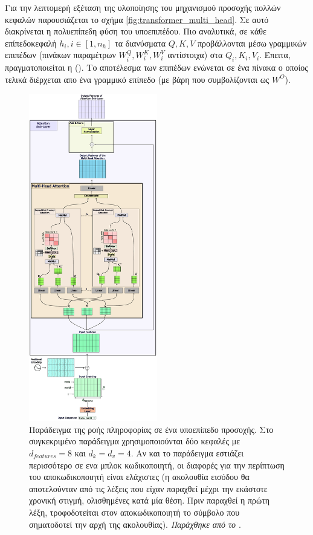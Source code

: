 Για την λεπτομερή εξέταση της υλοποίησης του μηχανισμού προσοχής πολλών κεφαλών παρουσιάζεται το σχήμα \ref{fig:transformer_multi_head}. Σε αυτό διακρίνεται η πολυεπίπεδη φύση του υπο\textendash επιπέδου. Πιο αναλυτικά, σε κάθε επίπεδο\textemdash κεφαλή $h_i, i \in [1,n_h]$ τα διανύσματα $Q, K, V$ προβάλλονται μέσω γραμμικών επιπέδων (πινάκων παραμέτρων $W_i^Q, W_i^K, W_i^V$ αντίστοιχα) στα $Q_i, K_i, V_i$. Έπειτα, πραγματοποιείται η  (). Το αποτέλεσμα των επιπέδων ενώνεται σε ένα πίνακα ο οποίος τελικά διέρχεται απο ένα γραμμικό επίπεδο (με βάρη που συμβολίζονται ως $W^O$). \par

\begin{figure}[p]
  \centering
  \includegraphics[width=0.5\textwidth]{images/chapter theoritical background/transformer_flow.pdf}
  \caption{Παράδειγμα της ροής πληροφορίας σε ένα υποεπίπεδο προσοχής. Στο συγκεκριμένο παράδειγμα χρησιμοποιούνται δύο κεφαλές με $d_{features} = 8$ και $d_k=d_v=4$. Αν και το παράδειγμα εστιάζει περισσότερο σε ενα μπλοκ κωδικοποιητή, οι διαφορές για την περίπτωση του αποκωδικοποιητή είναι ελάχιστες (η ακολουθία εισόδου θα αποτελούνταν από τις λέξεις που είχαν παραχθεί μέχρι την εκάστοτε χρονική στιγμή, ολισθημένες κατά μία θέση. Πριν παραχθεί η πρώτη λέξη, τροφοδοτείται στον αποκωδικοποιητή το σύμβολο  που σηματοδοτεί την αρχή της ακολουθίας). \textit{Παράχθηκε από το \href{https://inkscape.org/}{}}.}
  \label{fig:transformer_flow}
\end{figure}

